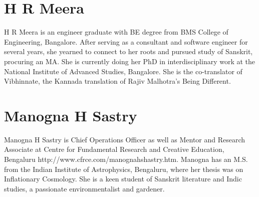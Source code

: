 \section*{H R Meera}

H R Meera is an engineer graduate with BE degree from BMS College of Engineering, Bangalore. After serving as a consultant and software engineer for several years, she yearned to connect to her roots and pursued study of Sanskrit, procuring an MA. She is currently doing her PhD in interdisciplinary work at the National Institute of Advanced Studies, Bangalore. She is the co-translator of Vibhinnate, the Kannada translation of Rajiv Malhotra’s Being Different.

\section*{Manogna H Sastry}

Manogna H Sastry is Chief Operations Officer as well as Mentor and Research Associate at Centre for Fundamental Research and Creative Education, Bengaluru http://www.cfrce.com/manognahshastry.htm. Manogna has an M.S. from the Indian Institute of Astrophysics, Bengaluru, where her thesis was on Inflationary Cosmology. She is a keen student of Sanskrit literature and Indic studies, a passionate environmentalist and gardener.
